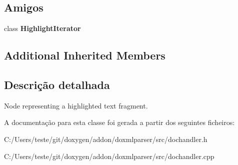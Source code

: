 \subsection*{Amigos}
\begin{DoxyCompactItemize}
\item 
\hypertarget{class_highlight_handler_a7aed790946df29e2ccac4eaa47911412}{class {\bfseries Highlight\-Iterator}}\label{class_highlight_handler_a7aed790946df29e2ccac4eaa47911412}

\end{DoxyCompactItemize}
\subsection*{Additional Inherited Members}


\subsection{Descrição detalhada}
Node representing a highlighted text fragment. 



A documentação para esta classe foi gerada a partir dos seguintes ficheiros\-:\begin{DoxyCompactItemize}
\item 
C\-:/\-Users/teste/git/doxygen/addon/doxmlparser/src/dochandler.\-h\item 
C\-:/\-Users/teste/git/doxygen/addon/doxmlparser/src/dochandler.\-cpp\end{DoxyCompactItemize}
